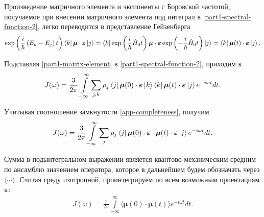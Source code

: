 \documentclass[12pt]{article}
\newcommand{\lb}{\left(}
\newcommand{\rb}{\right)}
\newcommand{\intty}{\int\limits_{-\infty}^\infty}
\newcommand{\mean}[1]{\langle #1 \rangle}
\newcommand{\bs}{\boldsymbol}
\begin{document}
Произведение матричного элемента и экспоненты с Боровской частотой, получаемое при внесении матричного элемента под интеграл в \eqref{part1-spectral-function-2}, легко переводится в представление Гейзенберга
\begin{gather}
    \exp \lb \frac{i}{\hbar} \lb E_k - E_j \rb t \rb \bra{k} \boldsymbol{\mu} \cdot \boldsymbol{\varepsilon} \ket{j} = \bra{k} \exp \lb \frac{i}{\hbar} \hat{H}_0 t \rb \boldsymbol{\mu} \cdot \boldsymbol{\varepsilon} \exp \lb -\frac{i}{\hbar} \hat{H}_0 t \rb \ket{j} = \bra{k} \boldsymbol{\mu}(t) \cdot \boldsymbol{\varepsilon} \ket{j}. \label{part1-matrix-element}
\end{gather}

Подставляя \eqref{part1-matrix-element} в \eqref{part1-spectral-function-2}, приходим к
\begin{gather}
    J(\omega) = \frac{3}{2\pi} \int\limits_{-\infty}^\infty \sum_{j,k} \rho_j \bra{j} \boldsymbol{\mu}(0) \cdot \boldsymbol{\varepsilon} \ket{k} \bra{k} \boldsymbol{\mu}(t) \cdot \boldsymbol{\varepsilon} \ket{j} e^{-i \omega t} dt.
\end{gather}

Учитывая соотношение замкнутости \eqref{app-completeness}, получим
\begin{gather}
    J(\omega) = \frac{3}{2\pi} \int\limits_{-\infty}^\infty \sum_j  \rho_{j} \bra{j} \boldsymbol{\mu}(0) \cdot \boldsymbol{\varepsilon} \cdot \boldsymbol{\mu}(t) \cdot \boldsymbol{\varepsilon} \ket{j} e^{-i\omega t} dt.
\end{gather}

Сумма в подынтегральном выражении является квантово-механическим средним по ансамблю значением оператора, которое в дальнейшем будем обозначать через $\langle \cdots \rangle$. Считая среду изотропной, проинтегрируем по всем возможным ориентациям $\boldsymbol{\varepsilon}$:
\begin{gather}
    J(\omega) = \frac{1}{2\pi} \intty \mean{ \bs{\mu}(0) \cdot \bs{\mu}(t) } e^{-i \omega t} dt. \label{litreview-spectral-function1}
\end{gather}
\end{document}
